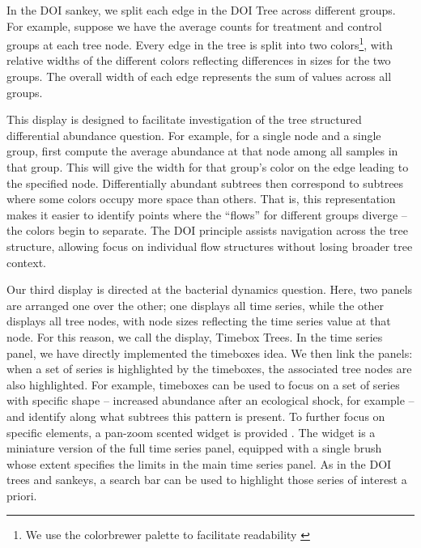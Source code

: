 \documentclass[12pt]{article}
\begin{document}
In the DOI sankey, we split each edge in the DOI Tree across different
groups. For example, suppose we have the average counts for treatment
and control groups at each tree node. Every edge in the tree is split
into two colors\footnote{We use the colorbrewer palette to facilitate
  readability \citep{brewer2003colorbrewer}}, with relative
widths of the different colors reflecting differences in sizes for the
two groups. The overall width of each edge represents the sum of values
across all groups.

This display is designed to facilitate investigation of the tree
structured differential abundance question. For example, for a single
node and a single group, first compute the average abundance at that
node among all samples in that group. This will give the width for that
group's color on the edge leading to the specified node. Differentially
abundant subtrees then correspond to subtrees where some colors occupy
more space than others. That is, this representation makes it easier to
identify points where the ``flows'' for different groups diverge -- the
colors begin to separate. The DOI principle assists navigation across
the tree structure, allowing focus on individual flow structures without
losing broader tree context.

Our third display is directed at the bacterial dynamics question. Here,
two panels are arranged one over the other; one displays all time
series, while the other displays all tree nodes, with node sizes
reflecting the time series value at that node. For this reason, we call
the display, Timebox Trees. In the time series panel, we have directly
implemented the timeboxes idea. We then link the panels: when a set of
series is highlighted by the timeboxes, the associated tree nodes are
also highlighted. For example, timeboxes can be used to focus on a set
of series with specific shape -- increased abundance after an ecological
shock, for example -- and identify along what subtrees this pattern is
present. To further focus on specific elements, a pan-zoom scented
widget is provided \citep{willett2007scented}. The widget is a miniature version
of the full time series panel, equipped with a single brush whose extent
specifies the limits in the main time series panel. As in the DOI trees and
sankeys, a search bar can be used to highlight those series of interest a
priori.
\end{document}
